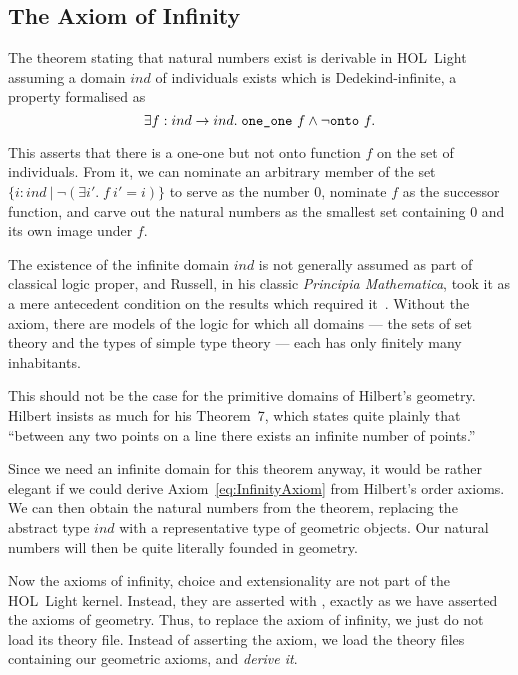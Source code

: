 \subsection{The Axiom of Infinity}
The theorem stating that natural numbers exist is derivable in HOL~Light assuming a domain $ind$ of individuals exists which is Dedekind-infinite, a property formalised as
\begin{equation}\label{eq:InfinityAxiom}
  \exists f : ind\rightarrow ind.\; \texttt{one\_one}\ f \wedge \neg\texttt{onto}\ f.
\end{equation}

This asserts that there is a one-one but not onto function $f$ on the set of individuals. From it, we can nominate an arbitrary member of the set \mbox{$\{ i : ind\ \vert\ \neg(\exists i'.\; f\ i' = i) \}$} to serve as the number $0$, nominate $f$ as the successor function, and carve out the natural numbers as the smallest set containing $0$ and its own image under $f$.

The existence of the infinite domain $ind$ is not generally assumed as part of classical logic proper, and Russell, in his classic \emph{Principia Mathematica}, took it as a mere antecedent condition on the results which required it~\cite{LogicismRevisited}. Without the axiom, there are models of the logic for which all domains --- the sets of set theory and the types of simple type theory --- each has only finitely many inhabitants.

This should not be the case for the primitive domains of Hilbert's geometry. Hilbert insists as much for his Theorem~7, which states quite plainly that ``between any two points on a line there exists an infinite number of points.'' 

Since we need an infinite domain for this theorem anyway, it would be rather elegant if we could derive Axiom~\ref{eq:InfinityAxiom} from Hilbert's order axioms. We can then obtain the natural numbers from the theorem, replacing the abstract type $ind$ with a representative type of geometric objects. Our natural numbers will then be quite literally founded in geometry.

Now the axioms of infinity, choice and extensionality are not part of the HOL~Light kernel. Instead, they are asserted with , exactly as we have asserted the axioms of geometry. Thus, to replace the axiom of infinity, we just do not load its theory file. Instead of asserting the axiom, we load the theory files containing our geometric axioms, and \emph{derive it}. 

